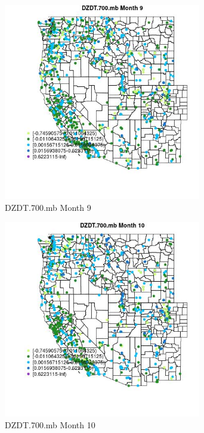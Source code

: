 \begin{figure} 
\centering  
\includegraphics[width=0.77\textwidth]{Code_Outputs/Report_ML_input_PM25_Step4_part_e_de_duplicated_aves_compiled_2019-05-21wNAs_MapObsMo9DZDT700mb.jpg} 
\caption{\label{fig:Report_ML_input_PM25_Step4_part_e_de_duplicated_aves_compiled_2019-05-21wNAsMapObsMo9DZDT700mb}DZDT.700.mb Month 9} 
\end{figure} 
 

\begin{figure} 
\centering  
\includegraphics[width=0.77\textwidth]{Code_Outputs/Report_ML_input_PM25_Step4_part_e_de_duplicated_aves_compiled_2019-05-21wNAs_MapObsMo10DZDT700mb.jpg} 
\caption{\label{fig:Report_ML_input_PM25_Step4_part_e_de_duplicated_aves_compiled_2019-05-21wNAsMapObsMo10DZDT700mb}DZDT.700.mb Month 10} 
\end{figure} 
 


